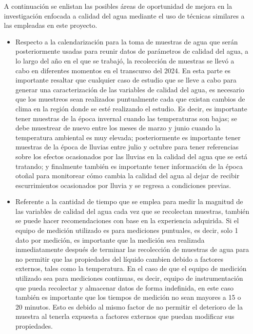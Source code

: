 A continuación se enlistan las posibles áreas de oportunidad de mejora en la investigación enfocada a calidad del agua mediante el uso de técnicas similares a las empleadas en este proyecto.

\begin{itemize}
    \item Respecto a la calendarización para la toma de muestras de agua que serán posteriormente usadas para reunir datos de parámetros de calidad del agua, a lo largo del año en el que se trabajó, la recolección de muestras 
    se llevó a cabo en diferentes momentos en el transcurso del 2024. En esta parte es importante resaltar que cualquier caso de estudio que se lleve a cabo para generar una caracterización de las variables de calidad del 
    agua, es necesario que los muestreos sean realizados puntualmente cada que existan cambios de clima en la región donde se esté realizando el estudio. Es decir, es importante tener muestras de la época invernal cuando 
    las temperaturas son bajas; se debe muestrear de nuevo entre los meses de marzo y junio cuando la temperatura ambiental es muy elevada; posteriormente es importante tener muestras de la época de lluvias entre julio y 
    octubre para tener referencias sobre los efectos ocasionados por las lluvias en la calidad del agua que se está tratando; y finalmente también es importante tener información de la época otoñal para monitorear cómo cambia 
    la calidad del agua al dejar de recibir escurrimientos ocasionados por lluvia y se regresa a condiciones previas.   
    \item Referente a la cantidad de tiempo que se emplea para medir la magnitud de las variables de calidad del agua cada vez que se recolectan muestras, también se puede hacer recomendaciones con base en la experiencia 
    adquirida. Si el equipo de medición utilizado es para mediciones puntuales, es decir, solo 1 dato por medición, es importante que la medición sea realizada inmediatamente después de terminar las recolección de muestras 
    de agua para no permitir que las propiedades del líquido cambien debido a factores externos, tales como la temperatura. En el caso de que el equipo de medición utilizado sea para mediciones continuas, es decir, equipo de  
    instrumentación que pueda recolectar y almacenar datos de forma indefinida, en este caso también es importante que los tiempos de medición no sean mayores a 15 o 20 minutos. Esto es debido al mismo factor de no permitir 
    el deterioro de la muestra al tenerla expuesta a factores externos que puedan modificar sus propiedades.

\end{itemize}
